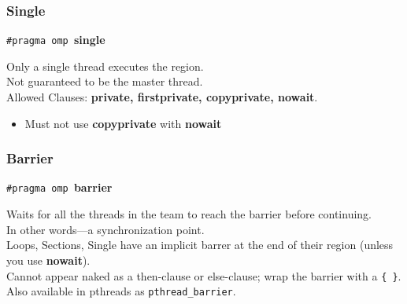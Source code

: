 \documentclass[aspectratio=43]{beamer}
\newenvironment{changemargin}[1]{%
  \begin{list}{}{%
    \setlength{\topsep}{0pt}%
    \setlength{\leftmargin}{#1}%
    \setlength{\rightmargin}{1em}
    \setlength{\listparindent}{\parindent}%
    \setlength{\itemindent}{\parindent}%
    \setlength{\parsep}{\parskip}%
  }%
  \item[]}{\end{list}}
\begin{document}
\begin{frame}[fragile]
  \frametitle{Single}

  \begin{changemargin}{1.5cm}
  \begin{center}
    {\tt \#pragma omp }{\bf single}
  \end{center}
    Only a single thread executes the region.\\[1em]
    Not guaranteed to be the master thread.\\[2em]
  Allowed Clauses: {\bf private, firstprivate, copyprivate, nowait}.
  \begin{itemize}
    \item Must not use {\bf copyprivate} with {\bf nowait}
  \end{itemize}
  \end{changemargin}

\end{frame}

\begin{frame}[fragile]
  \frametitle{Barrier}

  \begin{changemargin}{2.5cm}
  \begin{center}
    {\tt \#pragma omp }{\bf barrier}
  \end{center}

     Waits for all the threads in the team to reach the barrier before
      continuing.\\[1em]
     In other words---a synchronization point.\\[1em]
     Loops, Sections, Single have an implicit barrer at the end of their
      region (unless you use {\bf nowait}).\\[1em]
     Cannot appear naked as a then-clause or else-clause; wrap the barrier with a {\tt \{ \}}.\\[2em]
     Also available in pthreads as {\tt pthread\_barrier}.
  \end{changemargin}

\end{frame}
\end{document}
